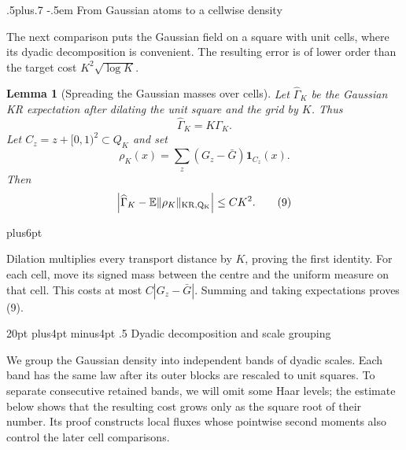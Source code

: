 \documentclass[11pt,reqno]{amsart}
\makeatletter
\def\section{\@startsection{section}{1}{0pt}%
  {20pt plus4pt minus4pt}
  {.5\linespacing}
  {\normalfont\bfseries}}
\def\subsection{\@startsection{subsection}{2}{0pt}%
  {.5\linespacing plus.7\linespacing}
  {-.5em}
  {\normalfont\scshape}}
\theoremstyle{plain}
\newtheorem{lemma}[theorem]{Lemma}
\theoremstyle{definition}
\theoremstyle{remark}
\renewenvironment{proof}[1][\proofname]{%
  \par
  \pushQED{\qed}%
  \normalfont
  \topsep6pt plus6pt\relax
  \trivlist
  \item[\hskip\labelsep\slshape #1\@addpunct{.}]%
  \ignorespaces
}{%
  \popQED
  \endtrivlist
  \@endpefalse
}
\DeclareRobustCommand{\qed}{%
  \leavevmode\unskip\penalty9999\hbox{}\nobreak
  \ifmmode
    \makebox[0pt][l]{\qquad\hbox{\qedsymbol}}%
  \else
    \qquad\hbox{\qedsymbol}%
  \fi
}
\renewcommand{\qedsymbol}{\rule[.47pt]{4pt}{6pt}}
\numberwithin{equation}{section}
\newcommand{\1}{\mathbf 1}
\makeatother
\begin{document}
\subsection{From Gaussian atoms to a cellwise density}

The next comparison puts the Gaussian field on a square with unit cells,
where its dyadic decomposition is convenient.  The resulting error is of
lower order than the target cost $K^2\sqrt{\log K}$.

\begin{lemma}[Spreading the Gaussian masses over cells]\label{lem:atom-to-cell}
Let $\widehat\Gamma_ K$ be the Gaussian KR expectation after dilating the
unit square and the grid by $K$. Thus
\begin{equation*}
\widehat\Gamma_ K=K\Gamma_ K.
\end{equation*}
Let $C_ z=z+[0,1)^2\subset Q_ K$ and set
\begin{equation*}
\rho_ K(x)=\sum_ z(G_ z-\bar G)\mathbf1_ {C_ z}(x).
\end{equation*}
Then
\begin{equation}
\left|\widehat\Gamma_ K-
\mathbb E\|\rho_ K\|_ {\rm KR,Q_ K}\right|\leq CK^2.
\tag{9}
\end{equation}

\end{lemma}

\begin{proof}
Dilation multiplies every transport distance by $K$, proving the first
identity. For each cell, move its signed mass between the centre and the
uniform measure on that cell. This costs at most
$C|G_ z-\bar G|$. Summing and taking expectations proves (9).

\end{proof}

\section{Dyadic decomposition and scale grouping}\label{sec:dyadic}

We group the Gaussian density into independent bands of dyadic scales.
Each band has the same law after its outer blocks are rescaled to unit
squares.  To separate consecutive retained bands, we will omit some Haar
levels; the estimate below shows that the resulting cost grows only as
the square root of their number.  Its proof constructs local fluxes whose
pointwise second moments also control the later cell comparisons.
\end{document}
